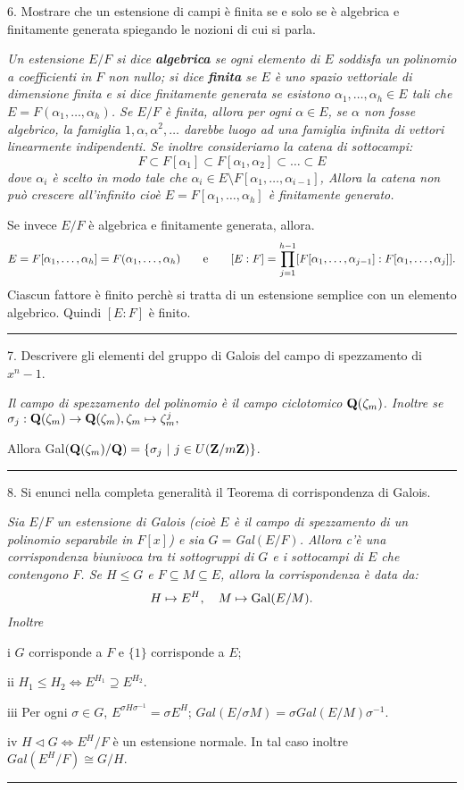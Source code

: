  \item{6.} Mostrare che un estensione di campi \`{e}  finita se
e solo se \`{e} algebrica e finitamente generata spiegando le
nozioni di cui si parla.\medskip

{\it Un estensione $E/F$ si dice {\bf algebrica} se ogni elemento
di $E$ soddisfa un polinomio a coefficienti in $F$ non nullo; si
dice {\bf finita} se $E$ \`{e} uno spazio vettoriale di dimensione
finita e si dice finitamente generata se esistono
$\alpha_1,\ldots,\alpha_h\in E$ tali che
$E=F(\alpha_1,\ldots,\alpha_h)$.
Se $E/F$ \`{e} finita, allora per ogni $\alpha\in E$, se $\alpha$ non fosse algebrico,
la famiglia $1,\alpha,\alpha^2,\ldots$ darebbe luogo ad una famiglia infinita di vettori
linearmente indipendenti. Se inoltre consideriamo la catena di sottocampi:
$$F\subset F[\alpha_1] \subset F[\alpha_1,\alpha_2] \subset \ldots \subset E$$
dove $\alpha_i$ \`{e} scelto in modo tale che $\alpha_i\in E\setminus F[\alpha_1,\ldots,\alpha_{i-1}]$,
Allora la catena non pu\`{o} crescere all'infinito cio\`{e} $E=F[\alpha_1,\ldots,\alpha_h]$ \`{e}
finitamente generato.\medskip

Se invece $E/F$ \`{e} algebrica e finitamente generata, allora.
$$E=F[\alpha_1,\ldots,\alpha_h]=F(\alpha_1,\ldots,\alpha_h)\quad\quad
{\rm e}\quad\quad
[E:F]=\prod_{j=1}^{h-1}[F[\alpha_1,\ldots,\alpha_{j-1}]:F[\alpha_1,\ldots,\alpha_j]].$$
Ciascun fattore \`{e} finito perch\`{e} si tratta di un estensione semplice con un elemento algebrico.
Quindi $[E:F]$ \`{e} finito.
}\medskip\hrule\medskip

\item{7.} Descrivere gli elementi del gruppo di Galois del campo
di spezzamento di $x^n-1$.\medskip

{\it Il campo di spezzamento del polinomio \`{e} il campo
ciclotomico ${\bf Q}(\zeta_m)$. Inoltre se
\quad $\sigma_j: {\bf Q}(\zeta_m) \rightarrow {\bf Q}(\zeta_m), \zeta_m
\mapsto \zeta_m^j,$\smallskip

Allora Gal$({\bf Q}(\zeta_m)/{\bf Q})=\{\sigma_j\ |\ j\in U({\bf
Z}/m{\bf Z})\}$.}\medskip\hrule\medskip

\item{8.} Si enunci nella completa generalit\`{a} il Teorema di
corrispondenza di Galois.\medskip

 {\it Sia $E/F$ un estensione di Galois
(cio\`{e} $E$ \`{e} il campo di spezzamento di un polinomio
separabile in $F[x]$) e sia $G=$Gal$(E/F)$. Allora c'\`{e} una
corrispondenza biunivoca tra ti sottogruppi di $G$ e i sottocampi
di $E$ che contengono $F$. Se $H\leq G$ e $F\subseteq M\subseteq
E$, allora la corrispondenza \`{e} data da:
$$H\mapsto E^H,\quad M\mapsto {\rm Gal}(E/M).$$
Inoltre \item{i} $G$ corrisponde a $F$ e $\{1\}$ corrisponde a
$E$; \item{ii} $H_1\leq H_2 \Leftrightarrow E^{H_1}\supseteq
E^{H_2}.$ \item{iii} Per ogni $\sigma\in G$,
    \itemitem{-} $E^{\sigma H\sigma^{-1}}=\sigma E^H$;
    \itemitem{-} $Gal(E/\sigma M)=\sigma Gal(E/M)\sigma^{-1}$.
\item{iv} $H\triangleleft G \Leftrightarrow E^H/F$ \`{e} un
estensione normale. In tal caso inoltre $Gal(E^H/F)\cong G/H.$}
\medskip\hrule
\medskip

